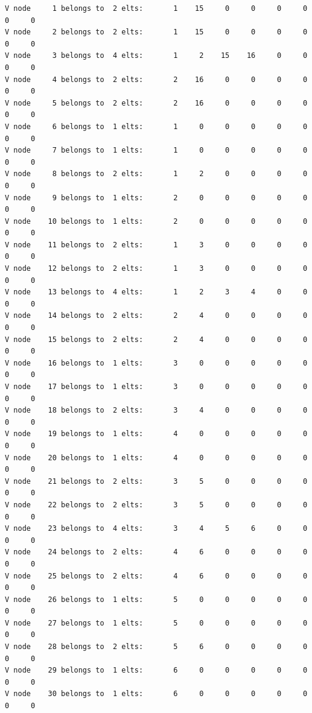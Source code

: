 \begin{small}
\begin{verbatim}
V node     1 belongs to  2 elts:       1    15     0     0     0     0     0     0
V node     2 belongs to  2 elts:       1    15     0     0     0     0     0     0
V node     3 belongs to  4 elts:       1     2    15    16     0     0     0     0
V node     4 belongs to  2 elts:       2    16     0     0     0     0     0     0
V node     5 belongs to  2 elts:       2    16     0     0     0     0     0     0
V node     6 belongs to  1 elts:       1     0     0     0     0     0     0     0
V node     7 belongs to  1 elts:       1     0     0     0     0     0     0     0
V node     8 belongs to  2 elts:       1     2     0     0     0     0     0     0
V node     9 belongs to  1 elts:       2     0     0     0     0     0     0     0
V node    10 belongs to  1 elts:       2     0     0     0     0     0     0     0
V node    11 belongs to  2 elts:       1     3     0     0     0     0     0     0
V node    12 belongs to  2 elts:       1     3     0     0     0     0     0     0
V node    13 belongs to  4 elts:       1     2     3     4     0     0     0     0
V node    14 belongs to  2 elts:       2     4     0     0     0     0     0     0
V node    15 belongs to  2 elts:       2     4     0     0     0     0     0     0
V node    16 belongs to  1 elts:       3     0     0     0     0     0     0     0
V node    17 belongs to  1 elts:       3     0     0     0     0     0     0     0
V node    18 belongs to  2 elts:       3     4     0     0     0     0     0     0
V node    19 belongs to  1 elts:       4     0     0     0     0     0     0     0
V node    20 belongs to  1 elts:       4     0     0     0     0     0     0     0
V node    21 belongs to  2 elts:       3     5     0     0     0     0     0     0
V node    22 belongs to  2 elts:       3     5     0     0     0     0     0     0
V node    23 belongs to  4 elts:       3     4     5     6     0     0     0     0
V node    24 belongs to  2 elts:       4     6     0     0     0     0     0     0
V node    25 belongs to  2 elts:       4     6     0     0     0     0     0     0
V node    26 belongs to  1 elts:       5     0     0     0     0     0     0     0
V node    27 belongs to  1 elts:       5     0     0     0     0     0     0     0
V node    28 belongs to  2 elts:       5     6     0     0     0     0     0     0
V node    29 belongs to  1 elts:       6     0     0     0     0     0     0     0
V node    30 belongs to  1 elts:       6     0     0     0     0     0     0     0

\end{verbatim}
\end{small}
